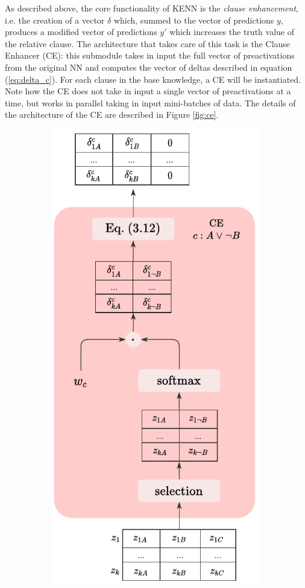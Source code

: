 As described above, the core functionality of KENN is the \textit{clause enhancement}, i.e. the creation of a vector $\delta$ which, summed to the vector of predictions $y$, produces a modified vector of predictions $y'$ which increases the truth value of the relative clause. The architecture that takes care of this task is the Clause Enhancer (CE): this submodule takes in input the full vector of preactivations from the original NN and computes the vector of deltas described in equation (\ref{eq:delta_c}). For each clause in the base knowledge, a CE will be instantiated. Note how the CE does not take in input a single vector of preactivations at a time, but works in parallel taking in input mini-batches of data. The details of the architecture of the CE are described in Figure \ref{fig:ce}.
\begin{figure}
	\centering
	\begin{subfigure}{.5\textwidth}
		\centering
		\includegraphics[width=0.8\linewidth]{figures/CE.pdf}

\end{subfigure}
\end{figure}
